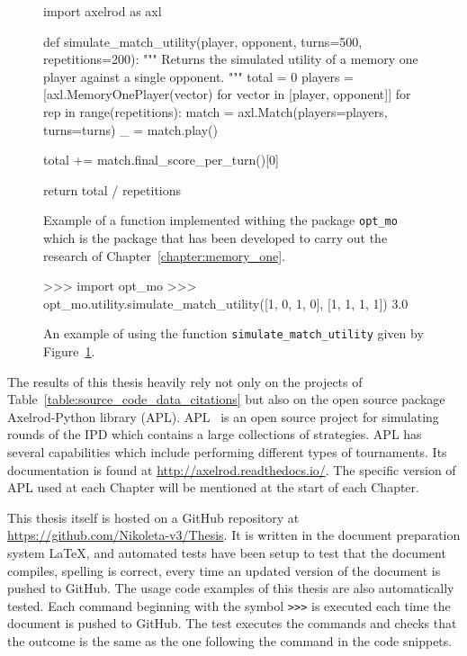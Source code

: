 \begin{figure}[htbp]
\begin{sourcepy}
import axelrod as axl

def simulate_match_utility(player, opponent, turns=500, repetitions=200):
    """
    Returns the simulated utility of a memory one player against a single opponent.
    """
    total = 0
    players = [axl.MemoryOnePlayer(vector) for vector in [player, opponent]]
    for rep in range(repetitions):
        match = axl.Match(players=players, turns=turns)
        _ = match.play()

        total += match.final_score_per_turn()[0]

    return total / repetitions
\end{sourcepy}
\caption{Example of a function implemented withing the package
\texttt{opt_mo} which is the package that has been developed to
carry out the research of Chapter~\ref{chapter:memory_one}.}\label{figure:source_code_example}
\end{figure}

\begin{figure}[htbp]
\begin{usagepy}
>>> import opt_mo
>>> opt_mo.utility.simulate_match_utility([1, 0, 1, 0], [1, 1, 1, 1])
3.0

\end{usagepy}
\caption{An example of using the function \texttt{simulate_match_utility}
given by Figure~\ref{figure:source_code_example}.}\label{figure:usage_code_example}
\end{figure}

The results of this thesis heavily rely not only on the projects of
Table~\ref{table:source_code_data_citations} but also on the open source package
Axelrod-Python library (APL). APL~\cite{axelrodproject} is an open source
project for simulating rounds of the IPD which contains a large collections of
strategies. APL has several capabilities which include performing different
types of tournaments. Its documentation is found at
\url{http://axelrod.readthedocs.io/}. The specific version of APL used at each
Chapter will be mentioned at the start of each Chapter.

This thesis itself is hosted on a GitHub repository at
\url{https://github.com/Nikoleta-v3/Thesis}. It is written in the document
preparation system \LaTeX, and automated tests have been setup to test
that the document compiles, spelling is correct, every time
an updated version of the document is pushed to GitHub. The usage code examples
of this thesis are also automatically tested. Each command beginning with the
symbol \texttt{>>>} is executed each time the document is pushed to GitHub.
The test executes the commands and checks that the outcome is the
same as the one following the command in the code snippets.

